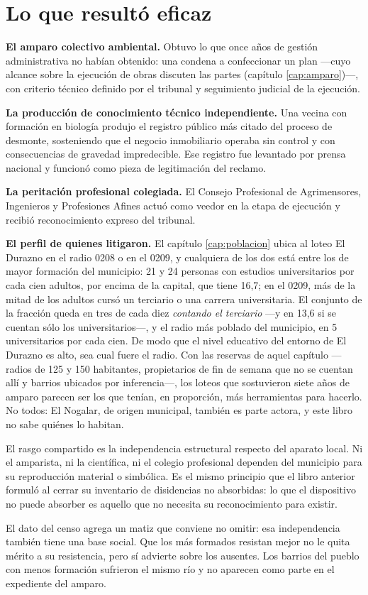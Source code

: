 \section{Lo que resultó eficaz}

\textbf{El amparo colectivo ambiental.} Obtuvo lo que once años de gestión administrativa no habían obtenido: una condena a confeccionar un plan ---cuyo alcance sobre la ejecución de obras discuten las partes (capítulo \ref{cap:amparo})---, con criterio técnico definido por el tribunal y seguimiento judicial de la ejecución.

\textbf{La producción de conocimiento técnico independiente.} Una vecina con formación en biología produjo el registro público más citado del proceso de desmonte, sosteniendo que el negocio inmobiliario operaba sin control y con consecuencias de gravedad impredecible. Ese registro fue levantado por prensa nacional y funcionó como pieza de legitimación del reclamo.

\textbf{La peritación profesional colegiada.} El Consejo Profesional de Agrimensores, Ingenieros y Profesiones Afines actuó como veedor en la etapa de ejecución y recibió reconocimiento expreso del tribunal.

\textbf{El perfil de quienes litigaron.} El capítulo \ref{cap:poblacion} ubica al loteo El Durazno en el radio 0208 o en el 0209, y cualquiera de los dos está entre los de mayor formación del municipio: 21 y 24 personas con estudios universitarios por cada cien adultos, por encima de la capital, que tiene 16,7; en el 0209, más de la mitad de los adultos cursó un terciario o una carrera universitaria. El conjunto de la fracción queda en tres de cada diez \textit{contando el terciario} ---y en 13,6 si se cuentan sólo los universitarios---, y el radio más poblado del municipio, en 5 universitarios por cada cien. De modo que el nivel educativo del entorno de El Durazno es alto, sea cual fuere el radio. Con las reservas de aquel capítulo ---radios de 125 y 150 habitantes, propietarios de fin de semana que no se cuentan allí y barrios ubicados por inferencia---, los loteos que sostuvieron siete años de amparo parecen ser los que tenían, en proporción, más herramientas para hacerlo. No todos: El Nogalar, de origen municipal, también es parte actora, y este libro no sabe quiénes lo habitan.

\begin{cautela}
El rasgo compartido es la independencia estructural respecto del aparato local. Ni el amparista, ni la científica, ni el colegio profesional dependen del municipio para su reproducción material o simbólica. Es el mismo principio que el libro anterior formuló al cerrar su inventario de disidencias no absorbidas: lo que el dispositivo no puede absorber es aquello que no necesita su reconocimiento para existir.

El dato del censo agrega un matiz que conviene no omitir: esa independencia también tiene una base social. Que los más formados resistan mejor no le quita mérito a su resistencia, pero sí advierte sobre los ausentes. Los barrios del pueblo con menos formación sufrieron el mismo río y no aparecen como parte en el expediente del amparo.
\end{cautela}

